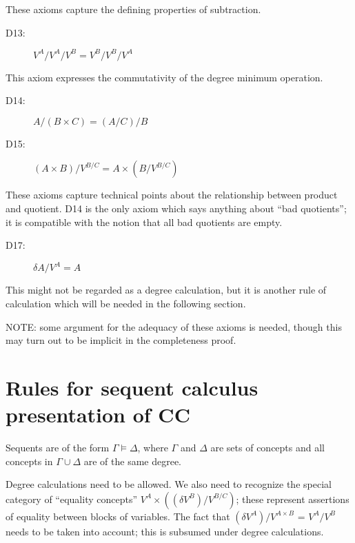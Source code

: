 \documentclass{article}
\begin{document}
These axioms capture the defining properties of subtraction.

\begin{description}

\item[D13:]  $V^A/V^A/V^B = V^B/V^B/V^A$

\end{description}

This axiom expresses the commutativity of the degree minimum
operation.

\begin{description}

\item[D14:]  $A/(B\times C) = (A/C)/B$

\item[D15:]  $(A \times B)/V^{B/C} = A \times (B/V^{B/C})$

\end{description}

These axioms capture technical points about the relationship between
product and quotient.  D14 is the only axiom which says anything about
``bad quotients''; it is compatible with the notion that all bad
quotients are empty.

\begin{description}

\item[D17:] $\delta A/V^A = A$

\end{description}

This might not be regarded as a degree calculation, but it is another
rule of calculation which will be needed in the following section.

NOTE:  some argument for the adequacy of these axioms is needed, though
this may turn out to be implicit in the completeness proof.

\section{Rules for sequent calculus presentation of CC}

Sequents are of the form $\Gamma \models \Delta$, where $\Gamma$ and
$\Delta$ are sets of concepts and all concepts in $\Gamma \cup \Delta$
are of the same degree.

Degree calculations need to be allowed.  We also need to recognize the
special category of ``equality concepts'' $V^A \times ((\delta
V^B)/V^{B/C})$; these represent assertions of equality between blocks
of variables.  The fact that $(\delta V^A)/V^{A \times B}$ = $V^A/V^B$
needs to be taken into account; this is subsumed under degree
calculations.
\end{document}
